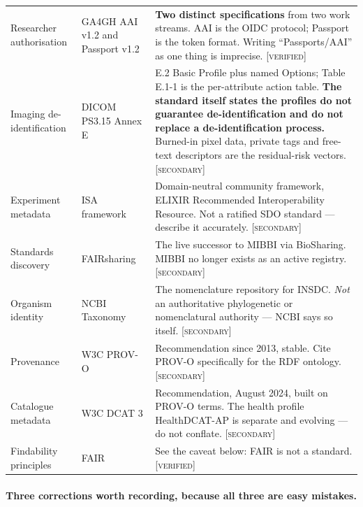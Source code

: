 \documentclass[11pt,a4paper]{article}
\newcommand{\flag}[1]{\textcolor{flagcolor}{\textbf{#1}}}
\newcommand{\verified}{\textsc{[verified]}}
\newcommand{\secondary}{\textsc{[secondary]}}
\begin{document}
\begin{center}
\begin{longtable}{L{0.20\textwidth} L{0.22\textwidth} L{0.46\textwidth}}
\addlinespace
Researcher authorisation & GA4GH AAI v1.2 \citep{ga4ghaai} and Passport
v1.2 \citep{ga4ghpassport} &
\flag{Two distinct specifications} from two work streams. AAI is the OIDC
protocol; Passport is the token format. Writing ``Passports/AAI'' as one
thing is imprecise. \verified \\
\addlinespace
Imaging de-identification & DICOM PS3.15 Annex E \citep{dicomps315} &
E.2 Basic Profile plus named Options; Table E.1-1 is the per-attribute
action table. \flag{The standard itself states the profiles do not guarantee
de-identification and do not replace a de-identification process.}
Burned-in pixel data, private tags and free-text descriptors are the
residual-risk vectors. \secondary \\
\addlinespace
Experiment metadata & ISA framework \citep{isatools} &
Domain-neutral community framework, ELIXIR Recommended Interoperability
Resource. Not a ratified SDO standard --- describe it accurately.
\secondary \\
\addlinespace
Standards discovery & FAIRsharing \citep{mcquilton2016biosharing} &
The live successor to MIBBI \citep{taylor2008mibbi} via BioSharing. MIBBI no
longer exists as an active registry. \secondary \\
\addlinespace
Organism identity & NCBI Taxonomy \citep{schoch2020ncbi} &
The nomenclature repository for INSDC. \emph{Not} an authoritative
phylogenetic or nomenclatural authority --- NCBI says so itself.
\secondary \\
\addlinespace
Provenance & W3C PROV-O \citep{w3cprov} &
Recommendation since 2013, stable. Cite PROV-O specifically for the RDF
ontology. \secondary \\
\addlinespace
Catalogue metadata & W3C DCAT 3 \citep{w3cdcat3} &
Recommendation, August 2024, built on PROV-O terms. The health profile
HealthDCAT-AP is separate and evolving --- do not conflate. \secondary \\
\addlinespace
Findability principles & FAIR \citep{wilkinson2016fair} &
See the caveat below: FAIR is not a standard. \verified \\
\end{longtable}
\end{center}

\paragraph{Three corrections worth recording, because all three are easy
mistakes.}
\end{document}
